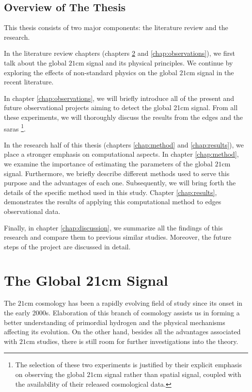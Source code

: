 \documentclass[12pt, TexShade, letterpaper]{report}
\begin{document}
\section{Overview of The Thesis}
This thesis consists of two major components: the literature review and the research.\par
In the literature review chapters (chapters \ref{chap:global21cm} and \ref{chap:observations}), we first talk about the global $\mathrm{21cm}$ signal and its physical principles. We continue by exploring the effects of non-standard physics on the global $\mathrm{21cm}$ signal in the recent literature. \par
In chapter \ref{chap:observations}, we will briefly introduce all of the present and future observational projects aiming to detect the global 21cm signal. From all these experiments, we will thoroughly discuss the results from the \gls{edges} \cite{edges} and the \gls{saras} \cite{saras_1} \footnote{The selection of these two experiments is justified by their explicit emphasis on observing the global $\mathrm{21cm}$ signal rather than spatial signal, coupled with the availability of their released cosmological data.}.\par
In the research half of this thesis (chapters \ref{chap:method} and \ref{chap:results}), we place a stronger emphasis on computational aspects. 
In chapter \ref{chap:method}, we examine the importance of estimating the parameters of the global $\mathrm{21cm}$ signal. Furthermore, we briefly describe different methods used to serve this purpose and the advantages of each one. Subsequently, we will bring forth the details of the specific method used in this study. Chapter \ref{chap:results}, demonstrates the results of applying this computational method to \gls{edges} observational data.\par
Finally, in chapter \ref{chap:discussion}, we summarize all the findings of this research and compare them to previous similar studies. Moreover, the future steps of the project are discussed in detail.\par

\chapter{The Global 21cm Signal}
\label{chap:global21cm}
The $\mathrm{21cm}$ cosmology has been a rapidly evolving field of study since its onset in the early 2000s. Elaboration of this branch of cosmology assists us in forming a better understanding of primordial hydrogen and the physical mechanisms affecting its evolution. On the other hand, besides all the advantages associated with $\mathrm{21cm}$ studies, there is still
room for further investigations into the theory. \par
\end{document}
